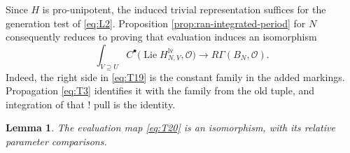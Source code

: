 \documentclass[11pt]{article}
\numberwithin{equation}{section}
\newtheorem{lemma}[theorem]{Lemma}
\theoremstyle{definition}
\theoremstyle{remark}
\begin{document}
Since $H$ is pro-unipotent, the induced trivial representation suffices
for the generation test of \eqref{eq:L2}.  Proposition
\ref{prop:ran-integrated-period} for $N$ consequently reduces to proving
that evaluation induces an isomorphism
\begin{equation}\label{eq:T20}
 \int_{V\supseteq U}
      C^\bullet\bigl(\operatorname{Lie}H_{N,V}^{\mathrm{lv}},
                    \mathcal O\bigr)
 \longrightarrow R\Gamma(B_N,\mathcal O).
\end{equation}
Indeed, the right side in \eqref{eq:T19} is the constant family in the
added markings.  Propagation \eqref{eq:T3} identifies it with the family
from the old tuple, and integration of that ! pull is the identity.

\begin{lemma}\label{lem:ran-unipotent-cohomology}
The evaluation map \eqref{eq:T20} is an isomorphism, with its relative
parameter comparisons.
\end{lemma}
\end{document}
